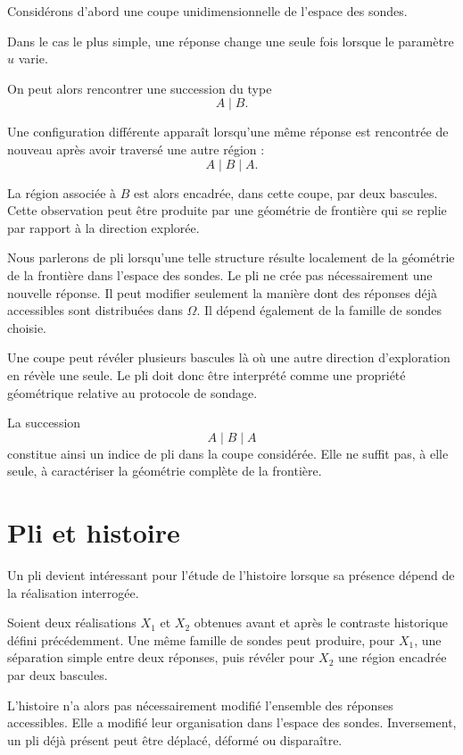 Considérons d'abord une coupe unidimensionnelle de l'espace des sondes.

Dans le cas le plus simple, une réponse change une seule fois lorsque le
paramètre $u$ varie.

On peut alors rencontrer une succession du type
\[
A \;|\; B.
\]

Une configuration différente apparaît lorsqu'une même réponse est
rencontrée de nouveau après avoir traversé une autre région :
\[
A \;|\; B \;|\; A.
\]

La région associée à $B$ est alors encadrée, dans cette coupe, par deux bascules. Cette observation peut être produite par une géométrie de frontière qui se replie par rapport à la direction explorée.

Nous parlerons de pli lorsqu'une telle structure résulte localement de la géométrie de la frontière dans l'espace des sondes. Le pli ne crée pas nécessairement une nouvelle réponse. Il peut modifier seulement la manière dont des réponses déjà accessibles sont distribuées dans $\Omega$. Il dépend également de la famille de sondes choisie.

Une coupe peut révéler plusieurs bascules là où une autre direction d'exploration en révèle une seule. Le pli doit donc être interprété comme une propriété géométrique relative au protocole de sondage.

La succession
\[
A \;|\; B \;|\; A
\]
constitue ainsi un indice de pli dans la coupe considérée. Elle ne suffit pas, à elle seule, à caractériser la géométrie complète de la frontière.

\section{Pli et histoire}
\label{t3-pli-et-histoire}

Un pli devient intéressant pour l'étude de l'histoire lorsque sa présence dépend de la réalisation interrogée.

Soient deux réalisations $X_1$ et $X_2$ obtenues avant et après le
contraste historique défini précédemment. Une même famille de sondes peut produire, pour $X_1$, une séparation simple entre deux réponses, puis révéler pour $X_2$ une région encadrée par deux bascules.

L'histoire n'a alors pas nécessairement modifié l'ensemble des réponses accessibles. Elle a modifié leur organisation dans l'espace des sondes. Inversement, un pli déjà présent peut être déplacé, déformé ou disparaître.

